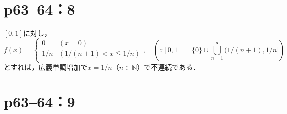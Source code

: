\section*{p63--64：8}
\begin{leftbar}
    $ [0,1]$に対し，
    \[
        f(x)= \begin{cases}
            0   & (x=0)                   \\
            1/n & (1/(n+1) < x \leqq 1/n) \\
        \end{cases}
        ,\quad \left ( \because [0,1] = \{ 0 \} \cup \bigcup_{n=1}^{\infty} (1/(n+1),1/n] \right )
    \]
    とすれば，広義単調増加で$x=1/n$（$n \in \mathbb{N}$）で不連続である．
\end{leftbar}
\newpage

\section*{p63--64：9}


